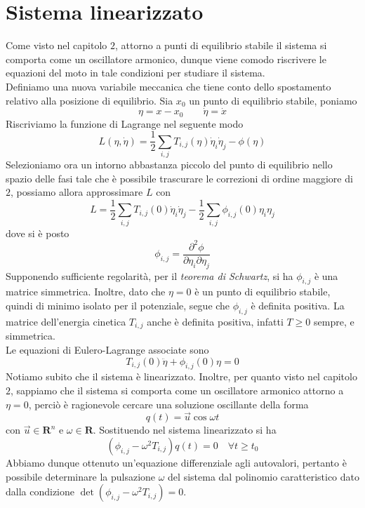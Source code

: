 \documentclass{article}
\begin{document}
\newpage
\section{Sistema linearizzato}
Come visto nel capitolo $2$, attorno a punti di equilibrio stabile il sistema si comporta come un oscillatore armonico, dunque viene comodo riscrivere le equazioni del moto in tale condizioni per studiare il sistema. \\
Definiamo una nuova variabile meccanica che tiene conto dello spostamento relativo alla posizione di equilibrio. Sia $x_0$ un punto di equilibrio stabile, poniamo
\begin{equation}
    \eta = x - x_0 \qquad \dot{\eta} = \dot{x} \tag{5.1}
\end{equation}
Riscriviamo la funzione di Lagrange nel seguente modo
\begin{equation}
    L(\eta, \dot{\eta}) = \frac{1}{2}\sum_{i,j} T_{i,j}(\eta)\dot{\eta}_i \dot{\eta}_j - \phi(\eta) \tag{5.2}
\end{equation}
Selezioniamo ora un intorno abbastanza piccolo del punto di equilibrio nello spazio delle fasi tale che è possibile trascurare le correzioni di ordine maggiore di $2$, possiamo allora approssimare $L$ con
\begin{equation}
    L = \frac{1}{2}\sum_{i,j}T_{i,j}(0)\dot{\eta}_i \dot{\eta}_j - \frac{1}{2}\sum_{i,j}\phi_{i,j}(0) \eta_i \eta_j \tag{5.3}
\end{equation}
dove si è posto
\begin{equation}
    \phi_{i,j} = \frac{\partial^2 \phi}{\partial \eta_i \partial \eta_j} \tag{5.4}
\end{equation}
Supponendo sufficiente regolarità, per il \textit{teorema di Schwartz}, si ha $\phi_{i,j}$ è una matrice simmetrica. Inoltre, dato che $\eta = 0$ è un punto di equilibrio stabile, quindi di minimo isolato per il potenziale, segue che $\phi_{i,j}$ è definita positiva. La matrice dell'energia cinetica $T_{i,j}$ anche è definita positiva, infatti $T \geq 0$ sempre, e simmetrica. \\
Le equazioni di Eulero-Lagrange associate sono
\begin{equation}
    T_{i,j}(0)\ddot{\eta} + \phi_{i,j}(0)\eta = 0 \tag{5.5}
\end{equation}
Notiamo subito che il sistema è linearizzato. Inoltre, per quanto visto nel capitolo $2$, sappiamo che il sistema si comporta come un oscillatore armonico attorno a $\eta = 0$, perciò è ragionevole cercare una soluzione oscillante della forma
\begin{equation}
    q(t) = \vec{u}\cos \omega t \tag{5.6}
\end{equation}
con $\vec{u} \in \mathbf{R}^n$ e $\omega \in \mathbf{R}$. Sostituendo nel sistema linearizzato si ha
\begin{equation}
    \left( \phi_{i,j} - \omega^2T_{i,j} \right) q(t) = 0 \quad \forall t \geq t_0 \tag{5.7}
\end{equation}
Abbiamo dunque ottenuto un'equazione differenziale agli autovalori, pertanto è possibile determinare la pulsazione $\omega$ del sistema dal polinomio caratteristico dato dalla condizione $\det\left( \phi_{i,j} - \omega^2T_{i,j} \right) = 0$.
\end{document}
